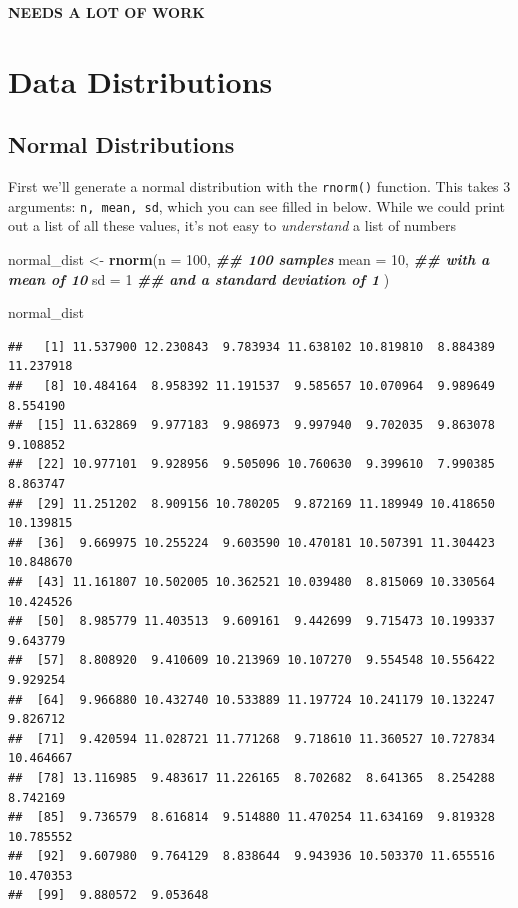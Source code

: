 \documentclass[
]{book}
\newenvironment{Shaded}{\begin{snugshade}}{\end{snugshade}}
\newcommand{\AttributeTok}[1]{\textcolor[rgb]{0.13,0.29,0.53}{#1}}
\newcommand{\DecValTok}[1]{\textcolor[rgb]{0.00,0.00,0.81}{#1}}
\newcommand{\DocumentationTok}[1]{\textcolor[rgb]{0.56,0.35,0.01}{\textbf{\textit{#1}}}}
\newcommand{\FunctionTok}[1]{\textcolor[rgb]{0.13,0.29,0.53}{\textbf{#1}}}
\newcommand{\NormalTok}[1]{#1}
\newcommand{\OtherTok}[1]{\textcolor[rgb]{0.56,0.35,0.01}{#1}}
\begin{document}
\textbf{NEEDS A LOT OF WORK}

\hypertarget{data-distributions}{%
\section{Data Distributions}\label{data-distributions}}

\hypertarget{normal-distributions}{%
\subsection{Normal Distributions}\label{normal-distributions}}

First we'll generate a normal distribution with the \texttt{rnorm()} function. This takes 3 arguments: \texttt{n,\ mean,\ sd}, which you can see filled in below. While we could print out a list of all these values, it's not easy to \emph{understand} a list of numbers

\begin{Shaded}
\begin{Highlighting}[]
\NormalTok{normal\_dist }\OtherTok{\textless{}{-}} \FunctionTok{rnorm}\NormalTok{(}\AttributeTok{n =} \DecValTok{100}\NormalTok{, }\DocumentationTok{\#\# 100 samples}
                     \AttributeTok{mean =} \DecValTok{10}\NormalTok{, }\DocumentationTok{\#\# with a mean of 10}
                     \AttributeTok{sd =} \DecValTok{1} \DocumentationTok{\#\# and a standard deviation of 1}
\NormalTok{                     )}


\NormalTok{normal\_dist}
\end{Highlighting}
\end{Shaded}

\begin{verbatim}
##   [1] 11.537900 12.230843  9.783934 11.638102 10.819810  8.884389 11.237918
##   [8] 10.484164  8.958392 11.191537  9.585657 10.070964  9.989649  8.554190
##  [15] 11.632869  9.977183  9.986973  9.997940  9.702035  9.863078  9.108852
##  [22] 10.977101  9.928956  9.505096 10.760630  9.399610  7.990385  8.863747
##  [29] 11.251202  8.909156 10.780205  9.872169 11.189949 10.418650 10.139815
##  [36]  9.669975 10.255224  9.603590 10.470181 10.507391 11.304423 10.848670
##  [43] 11.161807 10.502005 10.362521 10.039480  8.815069 10.330564 10.424526
##  [50]  8.985779 11.403513  9.609161  9.442699  9.715473 10.199337  9.643779
##  [57]  8.808920  9.410609 10.213969 10.107270  9.554548 10.556422  9.929254
##  [64]  9.966880 10.432740 10.533889 11.197724 10.241179 10.132247  9.826712
##  [71]  9.420594 11.028721 11.771268  9.718610 11.360527 10.727834 10.464667
##  [78] 13.116985  9.483617 11.226165  8.702682  8.641365  8.254288  8.742169
##  [85]  9.736579  8.616814  9.514880 11.470254 11.634169  9.819328 10.785552
##  [92]  9.607980  9.764129  8.838644  9.943936 10.503370 11.655516 10.470353
##  [99]  9.880572  9.053648
\end{verbatim}
\end{document}
